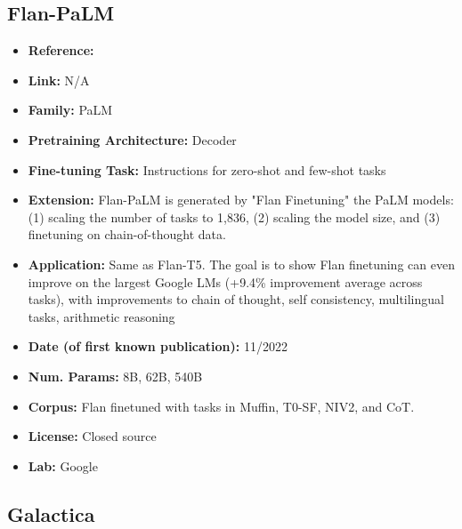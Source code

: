 \documentclass{article}
\begin{document}
\subsection{Flan-PaLM}
            \begin{itemize}
                \item \textbf{Reference:} \href{https://arxiv.org/abs/2210.11416}{ }
                \item \textbf{Link:} N/A
                \item \textbf{Family:} PaLM 
                \item \textbf{Pretraining Architecture:} Decoder
                \item \textbf{Fine-tuning Task:} Instructions for zero-shot and few-shot tasks
                \item \textbf{Extension:} Flan-PaLM is generated by "Flan Finetuning" the PaLM models: (1) scaling the number of tasks to 1,836, (2) scaling the model size, and (3) finetuning on chain-of-thought data.
                \item \textbf{Application:} Same as Flan-T5. The goal is to show Flan finetuning can even improve on the largest Google LMs (+9.4\% improvement average across tasks), with improvements to chain of thought, self consistency, multilingual tasks, arithmetic reasoning
                \item \textbf{Date (of first known publication):} 11/2022
                \item \textbf{Num. Params:} 8B, 62B, 540B
                \item \textbf{Corpus:} Flan finetuned with tasks in Muffin, T0-SF, NIV2, and CoT.
                \item \textbf{License:} Closed source
                \item \textbf{Lab:} Google
            \end{itemize}

\subsection{Galactica}
\end{document}
